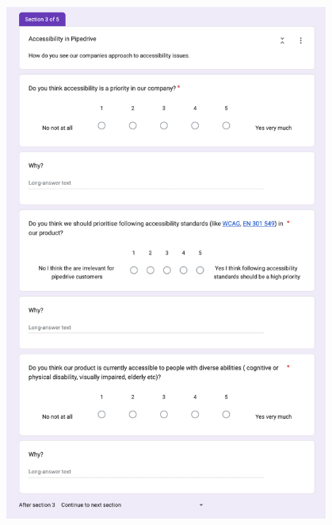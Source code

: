 \documentclass{master_thesis}
\begin{document}
\begin{figure}[H]
	\centering
	\includegraphics[width=0.95\textwidth]{img/surveys/pre-survey-2.png}
\end{figure}
\end{document}
